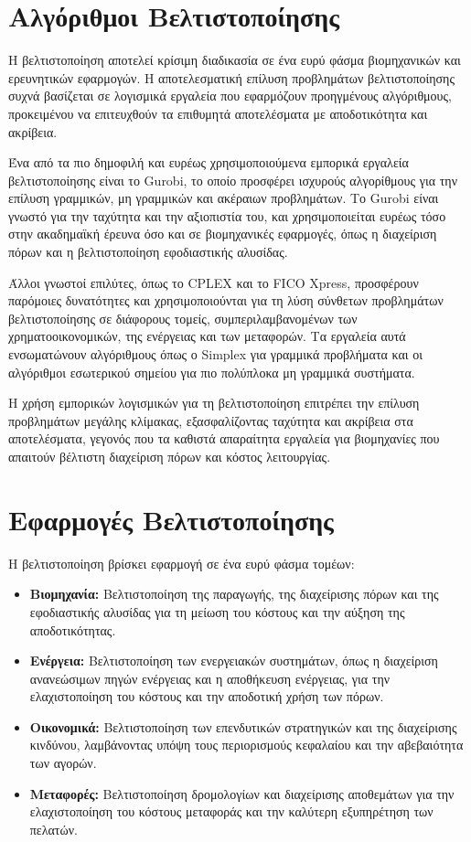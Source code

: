 \section{Αλγόριθμοι Βελτιστοποίησης}
Η βελτιστοποίηση αποτελεί κρίσιμη διαδικασία σε ένα ευρύ φάσμα βιομηχανικών και ερευνητικών εφαρμογών. Η αποτελεσματική επίλυση προβλημάτων βελτιστοποίησης συχνά βασίζεται σε λογισμικά εργαλεία που εφαρμόζουν προηγμένους αλγόριθμους, προκειμένου να επιτευχθούν τα επιθυμητά αποτελέσματα με αποδοτικότητα και ακρίβεια.

Ένα από τα πιο δημοφιλή και ευρέως χρησιμοποιούμενα εμπορικά εργαλεία βελτιστοποίησης είναι το \en Gurobi, \gr το οποίο προσφέρει ισχυρούς αλγορίθμους για την επίλυση γραμμικών, μη γραμμικών και ακέραιων προβλημάτων. Το \en Gurobi \gr είναι γνωστό για την ταχύτητα και την αξιοπιστία του, και χρησιμοποιείται ευρέως τόσο στην ακαδημαϊκή έρευνα όσο και σε βιομηχανικές εφαρμογές, όπως η διαχείριση πόρων και η βελτιστοποίηση εφοδιαστικής αλυσίδας.

Άλλοι γνωστοί επιλύτες, όπως το \en CPLEX \gr και το \en FICO Xpress, \gr προσφέρουν παρόμοιες δυνατότητες και χρησιμοποιούνται για τη λύση σύνθετων προβλημάτων βελτιστοποίησης σε διάφορους τομείς, συμπεριλαμβανομένων των χρηματοοικονομικών, της ενέργειας και των μεταφορών. Τα εργαλεία αυτά ενσωματώνουν αλγόριθμους όπως ο \en Simplex \gr για γραμμικά προβλήματα και οι αλγόριθμοι εσωτερικού σημείου για πιο πολύπλοκα μη γραμμικά συστήματα.

Η χρήση εμπορικών λογισμικών για τη βελτιστοποίηση επιτρέπει την επίλυση προβλημάτων μεγάλης κλίμακας, εξασφαλίζοντας ταχύτητα και ακρίβεια στα αποτελέσματα, γεγονός που τα καθιστά απαραίτητα εργαλεία για βιομηχανίες που απαιτούν βέλτιστη διαχείριση πόρων και κόστος λειτουργίας.

\section{Εφαρμογές Βελτιστοποίησης}
Η βελτιστοποίηση βρίσκει εφαρμογή σε ένα ευρύ φάσμα τομέων:
\begin{itemize}
    \item \textbf{Βιομηχανία:} Βελτιστοποίηση της παραγωγής, της διαχείρισης πόρων και της εφοδιαστικής αλυσίδας για τη μείωση του κόστους και την αύξηση της αποδοτικότητας.
    \\
    \item \textbf{Ενέργεια:} Βελτιστοποίηση των ενεργειακών συστημάτων, όπως η διαχείριση ανανεώσιμων πηγών ενέργειας και η αποθήκευση ενέργειας, για την ελαχιστοποίηση του κόστους και την αποδοτική χρήση των πόρων.
    \\
    \item \textbf{Οικονομικά:} Βελτιστοποίηση των επενδυτικών στρατηγικών και της διαχείρισης κινδύνου, λαμβάνοντας υπόψη τους περιορισμούς κεφαλαίου και την αβεβαιότητα των αγορών.
    \\
    \item \textbf{Μεταφορές:} Βελτιστοποίηση δρομολογίων και διαχείρισης αποθεμάτων για την ελαχιστοποίηση του κόστους μεταφοράς και την καλύτερη εξυπηρέτηση των πελατών.
\end{itemize}





